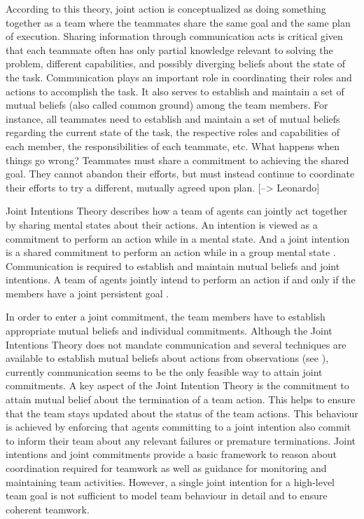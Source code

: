 \documentclass[11pt]{article}
\begin{document}
According to this theory, joint action is conceptualized as doing something
together as a team where the teammates share the same goal and the same plan of
execution. Sharing information through communication acts is critical given that
each teammate often has only partial knowledge relevant to solving the problem,
different capabilities, and possibly diverging beliefs about the state of the
task. Communication plays an important role in coordinating their roles and
actions to accomplish the task. It also serves to establish and maintain a set
of mutual beliefs (also called common ground) among the team members. For
instance, all teammates need to establish and maintain a set of mutual beliefs
regarding the current state of the task, the respective roles and capabilities
of each member, the responsibilities of each teammate, etc. What happens when
things go wrong? Teammates must share a commitment to achieving the shared goal.
They cannot abandon their efforts, but must instead continue to coordinate their
efforts to try a different, mutually agreed upon plan. [--> Leonardo]

Joint Intentions Theory describes how a team of agents can jointly act together
by sharing mental states about their actions. An intention is viewed as a
commitment to perform an action while in a mental state. And a joint intention
is a shared commitment to perform an action while in a group mental state
\cite{cohen:intention-commitment}. Communication is required to establish and
maintain mutual beliefs and joint intentions. A team of agents jointly intend to
perform an action if and only if the members have a joint persistent goal
\cite{cohen:teamwork}.

In order to enter a joint commitment, the team members have to establish
appropriate mutual beliefs and individual commitments. Although the Joint
Intentions Theory does not mandate communication and several techniques are
available to establish mutual beliefs about actions from observations (see
\cite{huber:without-communication}), currently communication seems to be the
only feasible way to attain joint commitments. A key aspect of the Joint
Intention Theory is the commitment to attain mutual belief about the termination
of a team action. This helps to ensure that the team stays updated about the
status of the team actions. This behaviour is achieved by enforcing that agents
committing to a joint intention also commit to inform their team about any
relevant failures or premature terminations. Joint intentions and joint
commitments provide a basic framework to reason about coordination required for
teamwork as well as guidance for monitoring and maintaining team activities.
However, a single joint intention for a high-level team goal is not sufficient
to model team behaviour in detail and to ensure coherent teamwork.
\end{document}
